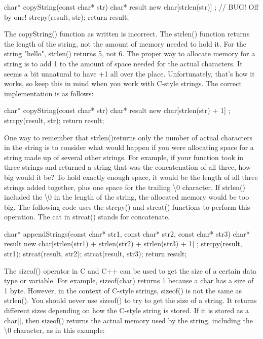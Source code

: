 \begin{cpp}
char* copyString(const char* str)
{
    char* result { new char[strlen(str)] }; // BUG! Off by one!
    strcpy(result, str);
    return result;
}
\end{cpp}

The copyString() function as written is incorrect. The strlen() function returns the length of the string, not the amount of memory needed to hold it. For the string "hello", strlen() returns 5, not 6. The proper way to allocate memory for a string is to add 1 to the amount of space needed for the actual characters. It seems a bit unnatural to have +1 all over the place. Unfortunately, that’s how it works, so keep this in mind when you work with C-style strings. The correct implementation is as follows:

\begin{cpp}
char* copyString(const char* str)
{
    char* result { new char[strlen(str) + 1] };
    strcpy(result, str);
    return result;
}
\end{cpp}

One way to remember that strlen()returns only the number of actual characters in the string is to consider what would happen if you were allocating space for a string made up of several other strings. For example, if your function took in three strings and returned a string that was the concatenation of all three, how big would it be? To hold exactly enough space, it would be the length of all three strings added together, plus one space for the trailing \textbackslash{}0 character. If strlen() included the \textbackslash{}0 in the length of the string, the allocated memory would be too big. The following code uses the strcpy() and strcat() functions to perform this operation. The cat in strcat() stands for concatenate.

\begin{cpp}
char* appendStrings(const char* str1, const char* str2, const char* str3)
{
    char* result { new char[strlen(str1) + strlen(str2) + strlen(str3) + 1] };
    strcpy(result, str1);
    strcat(result, str2);
    strcat(result, str3);
    return result;
}
\end{cpp}

The sizeof() operator in C and C++ can be used to get the size of a certain data type or variable. For example, sizeof(char) returns 1 because a char has a size of 1 byte. However, in the context of C-style strings, sizeof() is not the same as strlen(). You should never use sizeof() to try to get the size of a string. It returns different sizes depending on how the C-style string is stored. If it is stored as a char[], then sizeof() returns the actual memory used by the string, including the \textbackslash{}0 character, as in this example:

